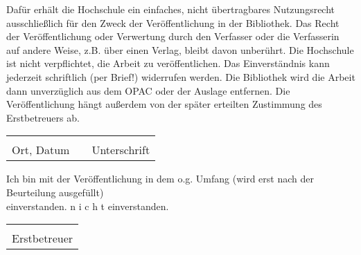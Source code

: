\bigskip
\bigskip

Daf\"ur erh\"alt die Hochschule ein einfaches, nicht \"ubertragbares Nutzungsrecht ausschlie{\ss}lich f\"ur den Zweck der Ver\"offentlichung in der Bibliothek. Das Recht der Ver\"offentlichung oder Verwertung durch den Verfasser oder die Verfasserin auf andere Weise, z.B. \"uber einen Verlag, bleibt davon unber\"uhrt. Die Hochschule ist nicht verpflichtet, die Arbeit zu ver\"offentlichen. Das Einverst\"andnis kann jederzeit schriftlich (per Brief!) widerrufen werden. Die Bibliothek wird die Arbeit dann unverz\"uglich aus dem OPAC oder der Auslage entfernen. Die Ver\"offentlichung h\"angt au{\ss}erdem von der sp\"ater erteilten Zustimmung des Erstbetreuers ab.

\bigskip
\bigskip

\begin{tabular}{lp{1cm}l}
    \hspace{6cm} && \hspace{6cm} \\ \cline{1-1} \cline{3-3}
    Ort, Datum && Unterschrift
\end{tabular}

\bigskip
\bigskip

Ich bin mit der Ver\"offentlichung in dem o.g. Umfang (wird erst nach der Beurteilung ausgef\"ullt)\\
\Square \hspace{0.2cm} einverstanden. \hspace{1cm} \Square \hspace{0.2cm} n i c h t einverstanden.

\bigskip
\bigskip

\begin{tabular}{l}
    \hspace{6cm} \\ \cline{1-1}
    Erstbetreuer
\end{tabular}

